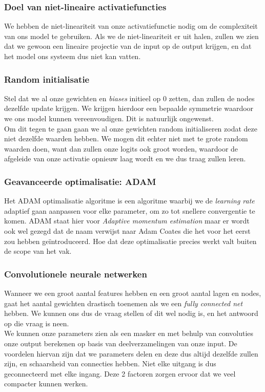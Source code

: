 \subsubsection{Doel van niet-lineaire activatiefuncties}

We hebben de niet-lineariteit van onze activatiefunctie nodig om de complexiteit van ons model te gebruiken. Als we de niet-lineariteit er uit halen, zullen we zien dat we gewoon een lineaire projectie van de input op de output krijgen, en dat het model ons systeem dus niet kan vatten.

\subsubsection{Random initialisatie}

Stel dat we al onze gewichten en \textit{biases} initieel op 0 zetten, dan zullen de nodes dezelfde update krijgen. We krijgen hierdoor een bepaalde symmetrie waardoor we ons model kunnen vereenvoudigen. Dit is natuurlijk ongewenst. \\
\newline
Om dit tegen te gaan gaan we al onze gewichten random initialiseren zodat deze niet dezelfde waarden hebben. We mogen dit echter niet met te grote random waarden doen, want dan zullen onze logits ook groot worden, waardoor de afgeleide van onze activatie opnieuw laag wordt en we dus traag zullen leren. 

\subsubsection{Geavanceerde optimalisatie: ADAM}

Het ADAM optimalisatie algoritme is een algoritme waarbij we de \textit{learning rate} adaptief gaan aanpassen voor elke parameter, om zo tot snellere convergentie te komen. ADAM staat hier voor \textit{Adaptive momentum estimation} maar er wordt ook wel gezegd dat de naam verwijst naar Adam Coates die het voor het eerst zou hebben geïntroduceerd. Hoe dat deze optimalisatie precies werkt valt buiten de scope van het vak.

\subsubsection{Convolutionele neurale netwerken}

Wanneer we een groot aantal features hebben en een groot aantal lagen en nodes, gaat het aantal gewichten drastisch toenemen als we een \textit{fully connected net} hebben. We kunnen ons dus de vraag stellen of dit wel nodig is, en het antwoord op die vraag is neen. \\
\newline
We kunnen onze parameters zien als een masker en met behulp van convoluties onze output berekenen op basis van deelverzamelingen van onze input. De voordelen hiervan zijn dat we parameters delen en deze dus altijd dezelfde zullen zijn, en schaarsheid van connecties hebben. Niet elke uitgang is dus geconnecteerd met elke ingang. Deze 2 factoren zorgen ervoor dat we veel compacter kunnen werken. 
